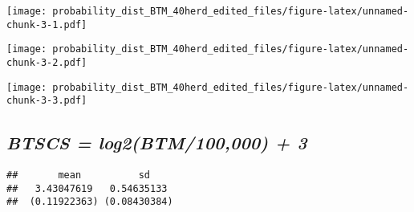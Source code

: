 \documentclass[]{article}
\newenvironment{Shaded}{\begin{snugshade}}{\end{snugshade}}
\newcommand{\KeywordTok}[1]{\textcolor[rgb]{0.13,0.29,0.53}{\textbf{#1}}}
\newcommand{\DataTypeTok}[1]{\textcolor[rgb]{0.13,0.29,0.53}{#1}}
\newcommand{\FloatTok}[1]{\textcolor[rgb]{0.00,0.00,0.81}{#1}}
\newcommand{\StringTok}[1]{\textcolor[rgb]{0.31,0.60,0.02}{#1}}
\newcommand{\OperatorTok}[1]{\textcolor[rgb]{0.81,0.36,0.00}{\textbf{#1}}}
\newcommand{\NormalTok}[1]{#1}
\begin{document}
\texttt{[image: probability\_dist\_BTM\_40herd\_edited\_files/figure-latex/unnamed-chunk-3-1.pdf]}

\begin{Shaded}
\end{Shaded}

\texttt{[image: probability\_dist\_BTM\_40herd\_edited\_files/figure-latex/unnamed-chunk-3-2.pdf]}

\begin{Shaded}
\end{Shaded}

\texttt{[image: probability\_dist\_BTM\_40herd\_edited\_files/figure-latex/unnamed-chunk-3-3.pdf]}

\subsection{\texorpdfstring{\textbf{\emph{BTSCS = log2(BTM/100,000) +
3}}}{BTSCS = log2(BTM/100,000) + 3}}\label{btscs-log2btm100000-3}

\begin{Shaded}
\end{Shaded}

\begin{verbatim}
##       mean          sd    
##   3.43047619   0.54635133 
##  (0.11922363) (0.08430384)
\end{verbatim}
\end{document}
